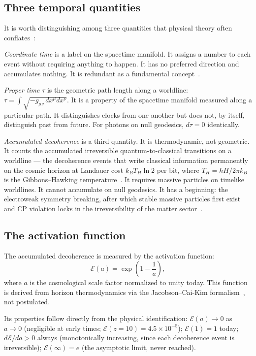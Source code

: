 \documentclass[12pt,a4paper]{article}
\begin{document}
\subsection{Three temporal quantities}

It is worth distinguishing among three quantities that physical theory
often conflates~\citep{IAM_time}:

\textit{Coordinate time} is a label on the spacetime manifold. It assigns
a number to each event without requiring anything to happen. It has no
preferred direction and accumulates nothing. It is redundant as a
fundamental concept~\citep{BarbourBertotti1982}.

\textit{Proper time} $\tau$ is the geometric path length along a worldline:
$\tau = \int \sqrt{-g_{\mu\nu}\,dx^\mu dx^\nu}$. It is a property of the
spacetime manifold measured along a particular path. It distinguishes clocks
from one another but does not, by itself, distinguish past from future.
For photons on null geodesics, $d\tau = 0$ identically.

\textit{Accumulated decoherence} is a third quantity. It is thermodynamic, not
geometric. It counts the accumulated irreversible
quantum-to-classical transitions on a worldline --- the decoherence events
that write classical information permanently on the cosmic horizon at
Landauer cost $k_B T_H \ln 2$ per bit, where $T_H = \hbar H / 2\pi k_B$
is the Gibbons--Hawking temperature~\citep{Gibbons1977}. It requires
massive particles on timelike worldlines. It cannot accumulate on null
geodesics. It has a beginning: the electroweak symmetry breaking, after
which stable massive particles first exist and CP violation locks in the
irreversibility of the matter sector~\citep{Sakharov1967}.

\subsection{The activation function}

The accumulated decoherence is measured by the activation function:
\begin{equation}
\mathcal{E}(a) = \exp\!\left(1 - \frac{1}{a}\right),
\label{eq:Ea}
\end{equation}
where $a$ is the cosmological scale factor normalized to unity today.
This function is derived from horizon thermodynamics via the Jacobson--Cai-Kim
formalism~\citep{Jacobson1995,CaiKim2005}, not postulated.

Its properties follow directly from the physical identification:
$\mathcal{E}(a) \to 0$ as $a \to 0$ (negligible at early times; $\mathcal{E}(z=10)=4.5\times10^{-5}$); $\mathcal{E}(1) = 1$ today; $d\mathcal{E}/da > 0$ always
(monotonically increasing, since each decoherence event is irreversible);
$\mathcal{E}(\infty) = e$ (the asymptotic limit, never reached).
\end{document}

